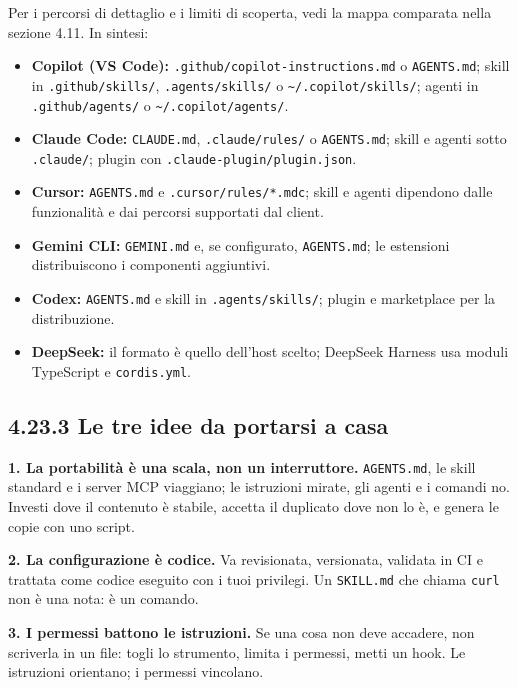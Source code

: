 \documentclass[
  italian,
  10pt,
]{book}
\providecommand{\tightlist}{%
  \setlength{\itemsep}{0pt}\setlength{\parskip}{0pt}}
\begin{document}
Per i percorsi di dettaglio e i limiti di scoperta, vedi la mappa
comparata nella sezione 4.11. In sintesi:

\begin{itemize}
\tightlist
\item
  \textbf{Copilot (VS Code):} \texttt{.github/copilot-instructions.md} o
  \texttt{AGENTS.md}; skill in \texttt{.github/skills/},
  \texttt{.agents/skills/} o
  \texttt{\textasciitilde{}/.copilot/skills/}; agenti in
  \texttt{.github/agents/} o
  \texttt{\textasciitilde{}/.copilot/agents/}.
\item
  \textbf{Claude Code:} \texttt{CLAUDE.md}, \texttt{.claude/rules/} o
  \texttt{AGENTS.md}; skill e agenti sotto \texttt{.claude/}; plugin con
  \texttt{.claude-plugin/plugin.json}.
\item
  \textbf{Cursor:} \texttt{AGENTS.md} e \texttt{.cursor/rules/*.mdc};
  skill e agenti dipendono dalle funzionalità e dai percorsi supportati
  dal client.
\item
  \textbf{Gemini CLI:} \texttt{GEMINI.md} e, se configurato,
  \texttt{AGENTS.md}; le estensioni distribuiscono i componenti
  aggiuntivi.
\item
  \textbf{Codex:} \texttt{AGENTS.md} e skill in
  \texttt{.agents/skills/}; plugin e marketplace per la distribuzione.
\item
  \textbf{DeepSeek:} il formato è quello dell'host scelto; DeepSeek
  Harness usa moduli TypeScript e \texttt{cordis.yml}.
\end{itemize}

\subsection{4.23.3 Le tre idee da portarsi a
casa}\label{le-tre-idee-da-portarsi-a-casa}

\textbf{1. La portabilità è una scala, non un interruttore.}
\texttt{AGENTS.md}, le skill standard e i server MCP viaggiano; le
istruzioni mirate, gli agenti e i comandi no. Investi dove il contenuto
è stabile, accetta il duplicato dove non lo è, e genera le copie con uno
script.

\textbf{2. La configurazione è codice.} Va revisionata, versionata,
validata in CI e trattata come codice eseguito con i tuoi privilegi. Un
\texttt{SKILL.md} che chiama \texttt{curl} non è una nota: è un comando.

\textbf{3. I permessi battono le istruzioni.} Se una cosa non deve
accadere, non scriverla in un file: togli lo strumento, limita i
permessi, metti un hook. Le istruzioni orientano; i permessi vincolano.
\end{document}
